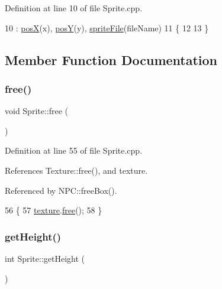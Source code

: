 Definition at line 10 of file Sprite.\+cpp.


\begin{DoxyCode}
10                                                                       : \hyperlink{class_sprite_a0af496e3e6540f1f1321913a741a737a}{posX}(x), 
      \hyperlink{class_sprite_a1ef80a5eff9d5b0bb90ae355daf09efe}{posY}(y), \hyperlink{class_sprite_a595ffe434aadbc94b9abd272c0356c9d}{spriteFile}(fileName)
11 \{
12 
13 \}
\end{DoxyCode}


\subsection{Member Function Documentation}
\mbox{\label{class_sprite_abce3359b4f055bac7384038046ed9ead}} 
\subsubsection{\texorpdfstring{free()}{free()}}
{\footnotesize\ttfamily void Sprite\+::free (\begin{DoxyParamCaption}{ }\end{DoxyParamCaption})}



Definition at line 55 of file Sprite.\+cpp.



References Texture\+::free(), and texture.



Referenced by N\+P\+C\+::free\+Box().


\begin{DoxyCode}
56 \{
57     \hyperlink{class_sprite_aa4978b284ebaae7225869d238dcb32cb}{texture}.\hyperlink{class_texture_a46d06aec832e5a954f1c8ca957c2c6e5}{free}();
58 \}
\end{DoxyCode}
\mbox{\label{class_sprite_a67b67082cfda90103d2d9eefea04cc4b}} 
\subsubsection{\texorpdfstring{get\+Height()}{getHeight()}}
{\footnotesize\ttfamily int Sprite\+::get\+Height (\begin{DoxyParamCaption}{ }\end{DoxyParamCaption})}



